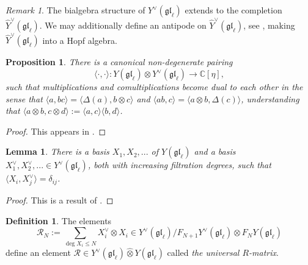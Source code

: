 \documentclass[11pt]{report}
\newtheorem{lemma}[theorem]{Lemma}
\newtheorem{prop}[theorem]{Proposition}
\theoremstyle{definition}
\newtheorem{definition}[theorem]{Definition}
\theoremstyle{remark}
\newtheorem*{remark}{Remark}
\theoremstyle{remark}
\newcommand{\C}{\mathbb{C}}
\begin{document}
\begin{remark}
The bialgebra structure of $Y^\vee(\mathfrak{gl}_\ell)$ extends to the completion $\hat Y^\vee(\mathfrak{gl}_\ell)$. We may additionally define an antipode on $\hat Y^\vee(\mathfrak{gl}_\ell)$, see \cite{article:nazarov:2019}, making $\hat Y^\vee(\mathfrak{gl}_\ell)$ into a Hopf algebra.
\end{remark}

\begin{prop}
There is a canonical non-degenerate pairing
\begin{equation*}
\langle \cdot,\cdot \rangle: Y(\mathfrak{gl}_\ell) \otimes Y^\vee(\mathfrak{gl}_\ell) \to \C[\eta],
\end{equation*}
such that multiplications and comultiplications become dual to each other in the sense that $\langle a,bc \rangle = \langle \Delta(a),b \otimes c \rangle$ and $\langle ab,c \rangle = \langle a \otimes b,\Delta(c) \rangle$, understanding that $\langle a \otimes b, c \otimes d \rangle := \langle a,c \rangle \langle b,d \rangle$.
\end{prop}

\begin{proof}
This appears in \cite{article:nazarov:2019}.
\end{proof}

\begin{lemma}
There is a basis $X_1,X_2,...$ of $Y(\mathfrak{gl}_\ell)$ and a basis $X_1^\vee,X_2^\vee,... \in Y^\vee(\mathfrak{gl}_\ell)$, both with increasing filtration degrees, such that $\langle X_i,X_j^\vee \rangle = \delta_{ij}$.
\end{lemma}

\begin{proof}
This is a result of \cite{article:nazarov:2019}.
\end{proof}

\begin{definition}
The elements
\begin{equation}\label{equation:universalRMatrixN}
\mathcal{R}_N := \sum_{\deg X_i \leq N} X_i^\vee \otimes X_i \in Y^\vee(\mathfrak{gl}_\ell)/F_{N+1} Y^\vee(\mathfrak{gl}_\ell) \otimes F_N Y(\mathfrak{gl}_\ell)
\end{equation}
define an element $\mathcal{R} \in Y^\vee(\mathfrak{gl}_\ell) \operatorname{\hat \otimes} Y(\mathfrak{gl}_\ell)$ called \emph{the universal $R$-matrix}.
\end{definition}
\end{document}
